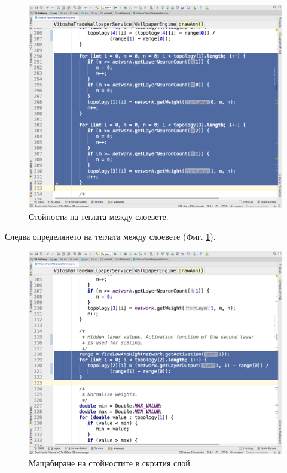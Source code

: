 \documentclass[book,14pt,oneside,openany]{memoir}
\begin{document}
\begin{figure}[h]
  \centering
  \includegraphics[height=0.45\pdfpageheight]{pic0060}
  \caption{Стойности на теглата между слоевете.}
\label{fig:pic0060}
\end{figure}
\FloatBarrier

Следва определянето на теглата между слоевете (Фиг. \ref{fig:pic0060}).

\begin{figure}[h]
  \centering
  \includegraphics[height=0.45\pdfpageheight]{pic0061}
  \caption{Мащабиране на стойностите в скрития слой.}
\label{fig:pic0061}
\end{figure}
\FloatBarrier
\end{document}
